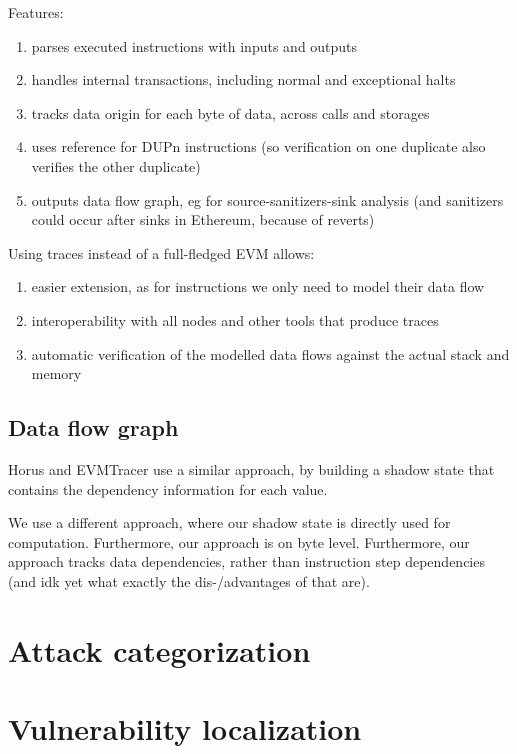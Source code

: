 \documentclass[draft,final]{vutinfth} %
\begin{document}
Features:

\begin{enumerate}
    \item parses executed instructions with inputs and outputs
    \item handles internal transactions, including normal and exceptional halts
    \item tracks data origin for each byte of data, across calls and storages
    \item uses reference for DUPn instructions (so verification on one duplicate also verifies the other duplicate)
    \item outputs data flow graph, eg for source-sanitizers-sink analysis (and sanitizers could occur after sinks in Ethereum, because of reverts)
\end{enumerate}

Using traces instead of a full-fledged EVM allows:

\begin{enumerate}
    \item easier extension, as for instructions we only need to model their data flow
    \item interoperability with all nodes and other tools that produce traces
    \item automatic verification of the modelled data flows against the actual stack and memory
\end{enumerate}

\subsection{Data flow graph}

Horus and EVMTracer use a similar approach, by building a shadow state that contains the dependency information for each value.

We use a different approach, where our shadow state is directly used for computation. Furthermore, our approach is on byte level. Furthermore, our approach tracks data dependencies, rather than instruction step dependencies (and idk yet what exactly the dis-/advantages of that are).

\section{Attack categorization}

\section{Vulnerability localization}
\end{document}
